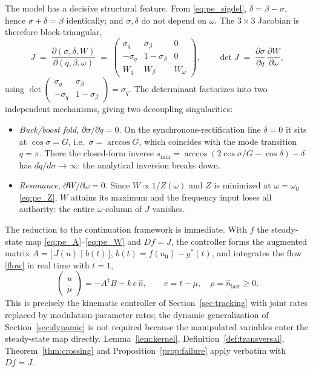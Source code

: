 \documentclass[11pt,american]{article}
\theoremstyle{definition}
\theoremstyle{plain}
\theoremstyle{remark}
\begin{document}
The model has a decisive structural feature. From \eqref{eq:pe_sigdel}, $\delta = \beta - \sigma$, hence $\sigma+\delta=\beta$ identically; and $\sigma,\delta$ do not depend on $\omega$. The $3\times 3$ Jacobian is therefore block-triangular,
\begin{equation}\label{eq:pe_jac}
J \;=\; \frac{\partial(\sigma,\delta,W)}{\partial(q,\beta,\omega)}
\;=\;
\begin{pmatrix}
\sigma_q & \sigma_\beta & 0 \\
-\sigma_q & 1-\sigma_\beta & 0 \\
W_q & W_\beta & W_\omega
\end{pmatrix},
\qquad
\det J \;=\; \frac{\partial\sigma}{\partial q}\,\frac{\partial W}{\partial\omega},
\end{equation}
using $\det\!\begin{pmatrix}\sigma_q & \sigma_\beta\\ -\sigma_q & 1-\sigma_\beta\end{pmatrix} = \sigma_q$. The determinant factorizes into two independent mechanisms, giving two decoupling singularities:
\begin{itemize}
\item[(S1)] \emph{Buck/boost fold}, $\partial\sigma/\partial q = 0$. On the synchronous-rectification line $\delta=0$ it sits at $\cos\sigma = G$, i.e.\ $\sigma = \arccos G$, which coincides with the mode transition $q=\pi$. There the closed-form inverse $s_{\min} = \arccos(2\cos\sigma/G - \cos\delta) - \delta$ has $dq/d\sigma \to \infty$: the analytical inversion breaks down.
\item[(S2)] \emph{Resonance}, $\partial W/\partial\omega = 0$. Since $W \propto 1/Z(\omega)$ and $Z$ is minimized at $\omega=\omega_0$ \eqref{eq:pe_Z}, $W$ attains its maximum and the frequency input loses all authority: the entire $\omega$-column of $J$ vanishes.
\end{itemize}

The reduction to the continuation framework is immediate. With $f$ the steady-state map \eqref{eq:pe_A}--\eqref{eq:pe_W} and $D f = J$, the controller forms the augmented matrix $A = \bigl[\, J(u)\;\big|\;b(t)\,\bigr]$, $b(t) = f(u_0) - y^*(t)$, and integrates the flow \eqref{flow} in real time with $\dot t = 1$,
\begin{equation}\label{eq:pe_flow}
\begin{pmatrix}\dot u \\ \dot\mu\end{pmatrix} = -A^\dagger B + k\,e\,\hat n, \qquad e = t-\mu,\quad \rho = \hat n_{\text{last}} \ge 0 .
\end{equation}
This is precisely the kinematic controller of Section~\ref{sec:tracking} with joint rates replaced by modulation-parameter rates; the dynamic generalization of Section~\ref{sec:dynamic} is not required because the manipulated variables enter the steady-state map directly. Lemma~\ref{lem:kernel}, Definition~\ref{def:transversal}, Theorem~\ref{thm:crossing} and Proposition~\ref{prop:failure} apply verbatim with $Df=J$.
\end{document}
